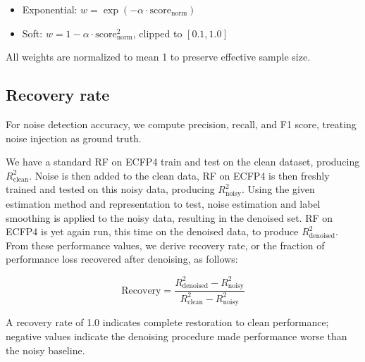 {\begin{itemize}
    \item Exponential: $w = \exp(-\alpha \cdot \text{score}_{\text{norm}})$
    
    \item Soft: $w = 1 - \alpha \cdot \text{score}_{\text{norm}}^2$, clipped to $[0.1, 1.0]$
\end{itemize}

All weights are normalized to mean 1 to preserve effective sample size.

\subsection{Recovery rate}

For noise detection accuracy, we compute precision, recall, and F1 score, treating noise injection as ground truth.

We have a standard RF on ECFP4 train and test on the clean dataset, producing $R^2_{\text{clean}}$. Noise is then added to the clean data, RF on ECFP4 is then freshly trained and tested on this noisy data, producing $R^2_{\text{noisy}}$. Using the given estimation method and representation to test, noise estimation and label smoothing is applied to the noisy data, resulting in the denoised set. RF on ECFP4 is yet again run, this time on the denoised data, to produce $R^2_{\text{denoised}}$. From these performance values, we derive recovery rate, or the fraction of performance loss recovered after denoising, as follows: 

$$
\text{Recovery} = \frac{R^2_{\text{denoised}} - R^2_{\text{noisy}}}{R^2_{\text{clean}} - R^2_{\text{noisy}}}
$$

A recovery rate of 1.0 indicates complete restoration to clean performance; negative values indicate the denoising procedure made performance worse than the noisy baseline.


}
